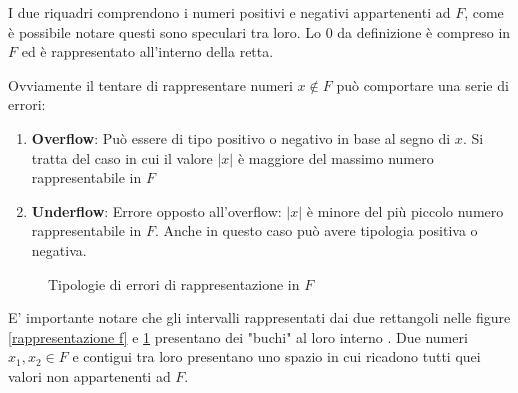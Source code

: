 \documentclass[12pt, a4paper]{book}
\theoremstyle{definition}
\begin{document}
\begin{flushleft}
I due riquadri comprendono i numeri positivi e negativi appartenenti ad $F$, come è possibile notare questi sono speculari tra loro. Lo 0 da definizione è compreso in $F$ ed è rappresentato all'interno della retta.

Ovviamente il tentare di rappresentare numeri $x \notin F$ può comportare una serie di errori:
\begin{enumerate}
	\item \textbf{Overflow}: Può essere di tipo positivo o negativo in base al segno di $x$.  Si tratta del caso in cui il valore  $ |x| $ è maggiore del massimo numero rappresentabile in $F$
	\item \textbf{Underflow}: Errore opposto all'overflow: $|x|$ è minore del più piccolo numero rappresentabile in $F$. Anche in questo caso può avere tipologia positiva o negativa.
\end{enumerate}

\begin{figure}[h!]
\centering
{}
\caption{Tipologie di errori di rappresentazione in $F$}
\label{rappresentazione errori f}
\end{figure}
 
E' importante notare che gli intervalli rappresentati dai due rettangoli nelle figure \ref{rappresentazione f} e \ref{rappresentazione errori f} presentano dei "buchi" al loro interno . Due numeri $x_{1}, x_{2} \in F$ e contigui tra loro presentano uno spazio in cui ricadono tutti quei valori non appartenenti ad $F$.
 

\end{flushleft}
\end{document}
